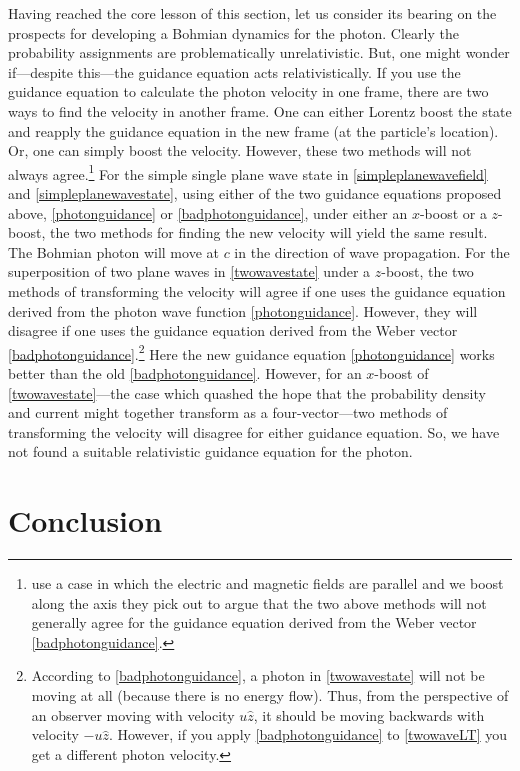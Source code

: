\documentclass[12pt,secnumarabic,amsmath,amssymb,balancelastpage,nofootinbib]{article}
\begin{document}
Having reached the core lesson of this section, let us consider its bearing on the prospects for developing a Bohmian dynamics for the photon.  Clearly the probability assignments are problematically unrelativistic.  But, one might wonder if---despite this---the guidance equation acts relativistically.  If you use the guidance equation to calculate the photon velocity in one frame, there are two ways to find the velocity in another frame.  One can either Lorentz boost the state and reapply the guidance equation in the new frame (at the particle's location).  Or, one can simply boost the velocity.  However, these two methods will not always agree.\footnote{\citet[pg.\ 235]{bohmhiley} use a case in which the electric and magnetic fields are parallel and we boost along the axis they pick out to argue that the two above methods will not generally agree for the guidance equation derived from the Weber vector \eqref{badphotonguidance}.}  For the simple single plane wave state in \eqref{simpleplanewavefield} and \eqref{simpleplanewavestate}, using either of the two guidance equations proposed above, \eqref{photonguidance} or \eqref{badphotonguidance}, under either an $x$-boost or a $z$-boost, the two methods for finding the new velocity will yield the same result.  The Bohmian photon will move at $c$ in the direction of wave propagation.  For the superposition of two plane waves in \eqref{twowavestate} under a $z$-boost, the two methods of transforming the velocity will agree if one uses the guidance equation derived from the photon wave function \eqref{photonguidance}.  However, they will disagree if one uses the guidance equation derived from the Weber vector \eqref{badphotonguidance}.\footnote{According to \eqref{badphotonguidance},  a photon in \eqref{twowavestate} will not be moving at all (because there is no energy flow).  Thus, from the perspective of an observer moving with velocity $u\hat{z}$, it should be moving backwards with velocity $-u\hat{z}$.  However, if you apply \eqref{badphotonguidance} to \eqref{twowaveLT} you get a different photon velocity.}  Here the new guidance equation \eqref{photonguidance} works better than the old \eqref{badphotonguidance}.  However, for an $x$-boost of \eqref{twowavestate}---the case which quashed the hope that the probability density and current might together transform as a four-vector---two methods of transforming the velocity will disagree for either guidance equation.  So, we have not found a suitable relativistic guidance equation for the photon.


\section{Conclusion}
\end{document}
